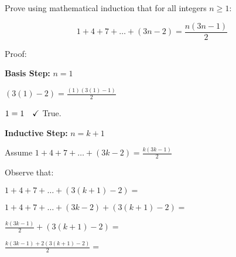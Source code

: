 \documentclass{article}
\newenvironment{Problem}
{\noindent\color{black}}
{\newline}
\newenvironment{Solution}
{\noindent\color{red}}
{\newline}
\begin{document}
\begin{Problem}
    Prove using mathematical induction that for all integers $n \geq 1$:

    $$1 + 4 + 7 + \dots + (3n - 2) = \frac{n(3n-1)}{2}$$
\end{Problem}


\begin{Solution}
    Proof:

    \phantom{ }

    \begin{adjustwidth}{2em}{0em}
        \textbf{Basis Step: } $n = 1$

        \phantom{ }

        \begin{adjustwidth}{2em}{0em}
            $\displaystyle (3(1) - 2) = \frac{(1)(3(1) - 1)}{2}$

            \phantom{ }

            $\displaystyle 1 = 1 \hspace*{1em} \checkmark$ True.
        \end{adjustwidth}

        \phantom{ }

        \textbf{Inductive Step: } $n = k + 1$

        \phantom{ }

        \begin{adjustwidth}{2em}{0em}
            Assume $\displaystyle 1 + 4 + 7 + \dots + (3k - 2) = \frac{k(3k-1)}{2}$
            
            \phantom{ }

            Observe that: 

            \phantom{ }

            \hspace*{4.8em}$\displaystyle 1 + 4 + 7 + \dots + (3(k+1) - 2) = $

            \phantom{ }

            $\displaystyle 1 + 4 + 7 + \dots + (3k - 2) + (3(k+1) - 2) = $
            
            \phantom{ }

            \hspace*{6.75em}$\displaystyle \frac{k(3k-1)}{2} + (3(k+1) - 2) = $

            \phantom{ }

            \hspace*{6.25em}$\displaystyle \frac{k(3k-1) + 2(3(k+1)-2)}{2}= $

            \phantom{ }


\end{adjustwidth}
\end{adjustwidth}
\end{Solution}
\end{document}
